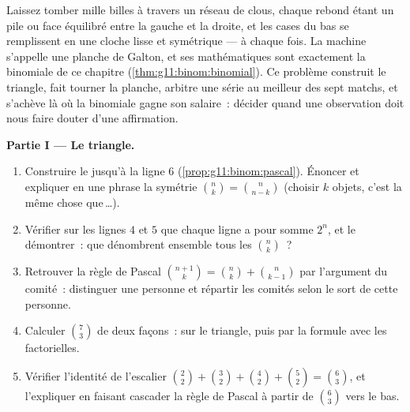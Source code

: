 \begin{problem}
\label{pb:g11:binom:1}
Laissez tomber mille billes à travers un réseau de clous, chaque
rebond étant un pile ou face équilibré entre la gauche et la droite,
et les cases du bas se remplissent en une cloche lisse et symétrique
--- à chaque fois. La machine s'appelle une planche de Galton, et
ses mathématiques sont exactement la  binomiale de ce chapitre
(\cref{thm:g11:binom:binomial}). Ce problème construit le triangle,
fait tourner la planche, arbitre une série au meilleur des sept
matchs, et s'achève là où la binomiale gagne son salaire~: décider
quand une observation doit nous faire douter d'une affirmation.

\medskip
\noindent\textbf{Partie I --- Le triangle.}
\begin{enumerate}
  \item Construire le  jusqu'à la ligne $6$
        (\cref{prop:g11:binom:pascal}). Énoncer et expliquer en une
        phrase la symétrie $\binom nk = \binom{n}{n-k}$ (choisir $k$
        objets, c'est la même chose que\,\dots).
  \item Vérifier sur les lignes $4$ et $5$ que chaque ligne a pour
        somme $2^n$, et le démontrer~: que dénombrent ensemble tous
        les $\binom nk$~?
  \item Retrouver la règle de Pascal
        $\binom{n+1}{k} = \binom nk + \binom{n}{k-1}$ par
        l'argument du comité~: distinguer une personne et répartir
        les comités selon le sort de cette personne.
  \item Calculer $\binom73$ de deux façons~: sur le triangle, puis
        par la formule avec les factorielles.
  \item Vérifier l'identité de l'escalier
        $\binom22 + \binom32 + \binom42 + \binom52 = \binom63$, et
        l'expliquer en faisant cascader la règle de Pascal à partir
        de $\binom63$ vers le bas.
\end{enumerate}


\end{problem}

